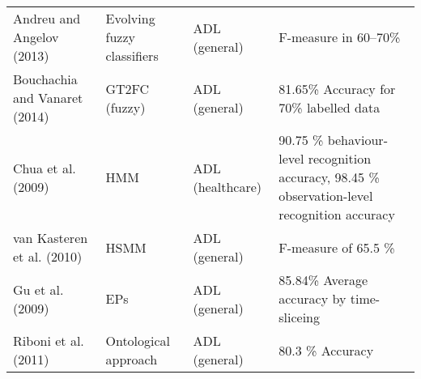 \begin{table}[]
\begin{tabular}{llll}
Andreu and Angelov (2013)        & Evolving fuzzy classifiers & ADL (general)       & F-measure in 60–70\%                                                                           \\
Bouchachia and Vanaret (2014)    & GT2FC (fuzzy)              & ADL (general)       & 81.65\% Accuracy for 70\% labelled data                                                        \\
Chua et al. (2009)               & HMM                        & ADL (healthcare)    & 90.75 \% behaviour-level recognition accuracy, 98.45 \% observation-level recognition accuracy \\
van Kasteren et al. (2010)       & HSMM                       & ADL (general)       & F-measure of 65.5 \%                                                                           \\
Gu et al. (2009)                 & EPs                        & ADL (general)       & 85.84\% Average accuracy by time-sliceing                                                      \\
Riboni et al. (2011)             & Ontological approach       & ADL (general)       & 80.3 \% Accuracy                                                                              
\end{tabular}
\end{table}
